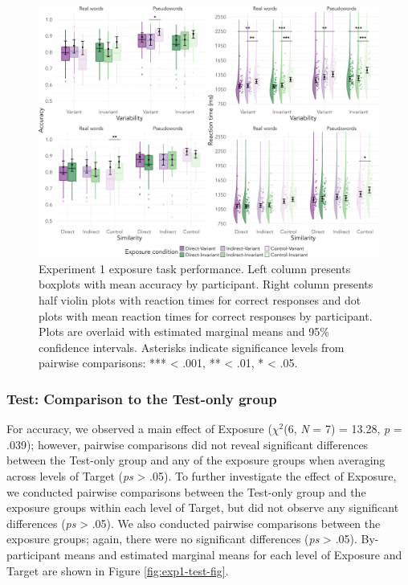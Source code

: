 \documentclass[preprint, 3p, authoryear]{elsarticle} %
\begin{document}
\begin{figure}

{\centering \includegraphics[width=\textwidth]{sections/code/outputs/plot_exp_1a} 

}

\caption{Experiment 1 exposure task performance. Left column presents boxplots with mean accuracy by participant. Right column presents half violin plots with reaction times for correct responses and dot plots with mean reaction times for correct responses by participant. Plots are overlaid with estimated marginal means and 95\% confidence intervals. Asterisks indicate significance levels from pairwise comparisons: *** < .001, ** < .01, * < .05.}\label{fig:exp1-exp-fig}
\end{figure}

\hypertarget{test-comparison-to-the-test-only-group}{%
\subsubsection{Test: Comparison to the Test-only group}\label{test-comparison-to-the-test-only-group}}

For accuracy, we observed a main effect of Exposure (\(\chi^2\)(6, \emph{N} = 7) = 13.28, \emph{p} = .039); however, pairwise comparisons did not reveal significant differences between the Test-only group and any of the exposure groups when averaging across levels of Target (\emph{ps} \textgreater{} .05).
To further investigate the effect of Exposure, we conducted pairwise comparisons between the Test-only group and the exposure groups within each level of Target, but did not observe any significant differences (\emph{ps} \textgreater{} .05).
We also conducted pairwise comparisons between the exposure groups; again, there were no significant differences (\emph{ps} \textgreater{} .05).
By-participant means and estimated marginal means for each level of Exposure and Target are shown in Figure \ref{fig:exp1-test-fig}.
\end{document}
